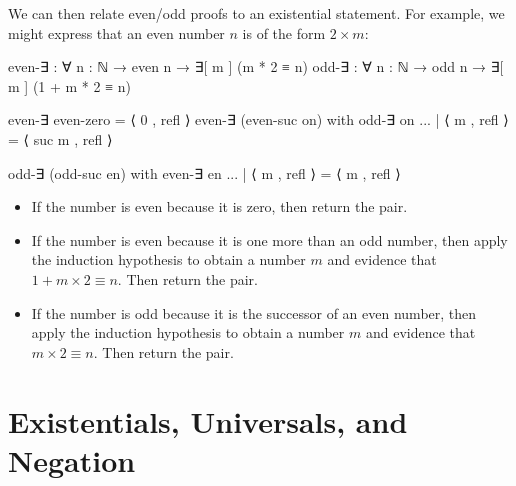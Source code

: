 \documentclass{lecturenotes}
\begin{document}
We can then relate even/odd proofs to an existential statement. 
For example, we might express that an even number $n$ is of the form $2 \times m$:
\begin{code}
even-∃ : ∀ {n : ℕ} → even n → ∃[ m ] (m * 2 ≡ n)
odd-∃ : ∀ {n : ℕ} → odd n → ∃[ m ] (1 + m * 2 ≡ n)

even-∃ even-zero = ⟨ 0 , refl ⟩
even-∃ (even-suc on) with odd-∃ on
... | ⟨ m , refl ⟩ = ⟨ suc m , refl ⟩

odd-∃ (odd-suc en) with even-∃ en
... | ⟨ m , refl ⟩ = ⟨ m , refl ⟩
\end{code}
\begin{itemize}
  \item If the number is even because it is zero, then return the pair.
  \item If the number is even because it is one more than an odd number, 
  then apply the induction hypothesis to obtain a number $m$ and evidence that $1 + m \times 2 \equiv n$. Then return the pair.
  \item If the number is odd because it is the successor of an even number, 
  then apply the induction hypothesis to obtain a number $m$ and evidence that $m \times 2 \equiv n$. Then return the pair.
\end{itemize}
\newpage
\section{Existentials, Universals, and Negation}
\label{sec:additional}
\end{document}
